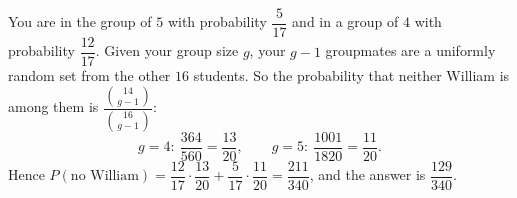 You are in the group of $5$ with probability $\dfrac5{17}$ and in a group of $4$ with probability $\dfrac{12}{17}$. Given your group size $g$, your $g-1$ groupmates are a uniformly random set from the other $16$ students. So the probability that neither William is among them is $\dfrac{\binom{14}{g-1}}{\binom{16}{g-1}}$:
\[g=4:\ \dfrac{364}{560}=\dfrac{13}{20},\qquad g=5:\ \dfrac{1001}{1820}=\dfrac{11}{20}.\]
Hence $P(\text{no William})=\dfrac{12}{17}\cdot\dfrac{13}{20}+\dfrac5{17}\cdot\dfrac{11}{20}=\dfrac{211}{340}$, and the answer is $\boxed{\dfrac{129}{340}}$.
